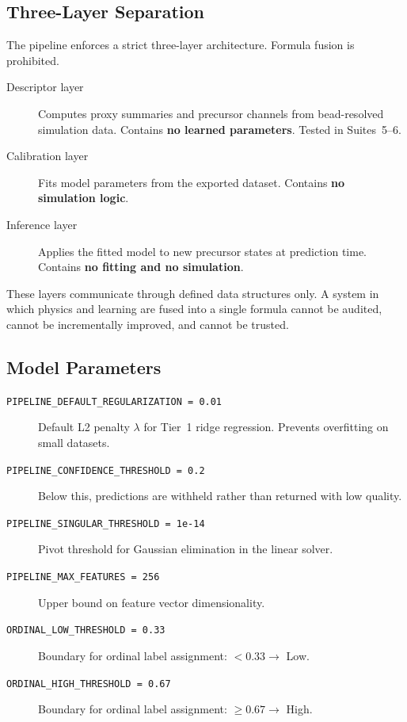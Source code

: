 \documentclass[11pt]{article}
\begin{document}
\subsection{Three-Layer Separation}

The pipeline enforces a strict three-layer architecture.  Formula fusion
is prohibited.

\begin{description}
  \item[Descriptor layer] Computes proxy summaries and precursor channels
    from bead-resolved simulation data.  Contains \textbf{no learned
    parameters}.  Tested in Suites~5--6.
  \item[Calibration layer] Fits model parameters from the exported
    dataset.  Contains \textbf{no simulation logic}.
  \item[Inference layer] Applies the fitted model to new precursor states
    at prediction time.  Contains \textbf{no fitting and no simulation}.
\end{description}

These layers communicate through defined data structures only.  A system
in which physics and learning are fused into a single formula cannot be
audited, cannot be incrementally improved, and cannot be trusted.

\subsection{Model Parameters}

\begin{description}
  \item[\texttt{PIPELINE\_DEFAULT\_REGULARIZATION = 0.01}]
    Default L2 penalty $\lambda$ for Tier~1 ridge regression.
    Prevents overfitting on small datasets.
  \item[\texttt{PIPELINE\_CONFIDENCE\_THRESHOLD = 0.2}]
    Below this, predictions are withheld rather than returned with
    low quality.
  \item[\texttt{PIPELINE\_SINGULAR\_THRESHOLD = 1e-14}]
    Pivot threshold for Gaussian elimination in the linear solver.
  \item[\texttt{PIPELINE\_MAX\_FEATURES = 256}]
    Upper bound on feature vector dimensionality.
  \item[\texttt{ORDINAL\_LOW\_THRESHOLD = 0.33}]
    Boundary for ordinal label assignment: $< 0.33 \to$ Low.
  \item[\texttt{ORDINAL\_HIGH\_THRESHOLD = 0.67}]
    Boundary for ordinal label assignment: $\geq 0.67 \to$ High.
\end{description}
\end{document}
